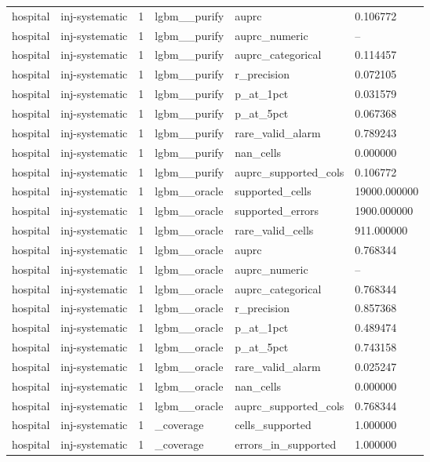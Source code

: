 \begin{tabular}{llllll}
hospital & inj-systematic & 1 & lgbm\_\_purify & auprc & 0.106772 \\
hospital & inj-systematic & 1 & lgbm\_\_purify & auprc\_numeric & -- \\
hospital & inj-systematic & 1 & lgbm\_\_purify & auprc\_categorical & 0.114457 \\
hospital & inj-systematic & 1 & lgbm\_\_purify & r\_precision & 0.072105 \\
hospital & inj-systematic & 1 & lgbm\_\_purify & p\_at\_1pct & 0.031579 \\
hospital & inj-systematic & 1 & lgbm\_\_purify & p\_at\_5pct & 0.067368 \\
hospital & inj-systematic & 1 & lgbm\_\_purify & rare\_valid\_alarm & 0.789243 \\
hospital & inj-systematic & 1 & lgbm\_\_purify & nan\_cells & 0.000000 \\
hospital & inj-systematic & 1 & lgbm\_\_purify & auprc\_supported\_cols & 0.106772 \\
hospital & inj-systematic & 1 & lgbm\_\_oracle & supported\_cells & 19000.000000 \\
hospital & inj-systematic & 1 & lgbm\_\_oracle & supported\_errors & 1900.000000 \\
hospital & inj-systematic & 1 & lgbm\_\_oracle & rare\_valid\_cells & 911.000000 \\
hospital & inj-systematic & 1 & lgbm\_\_oracle & auprc & 0.768344 \\
hospital & inj-systematic & 1 & lgbm\_\_oracle & auprc\_numeric & -- \\
hospital & inj-systematic & 1 & lgbm\_\_oracle & auprc\_categorical & 0.768344 \\
hospital & inj-systematic & 1 & lgbm\_\_oracle & r\_precision & 0.857368 \\
hospital & inj-systematic & 1 & lgbm\_\_oracle & p\_at\_1pct & 0.489474 \\
hospital & inj-systematic & 1 & lgbm\_\_oracle & p\_at\_5pct & 0.743158 \\
hospital & inj-systematic & 1 & lgbm\_\_oracle & rare\_valid\_alarm & 0.025247 \\
hospital & inj-systematic & 1 & lgbm\_\_oracle & nan\_cells & 0.000000 \\
hospital & inj-systematic & 1 & lgbm\_\_oracle & auprc\_supported\_cols & 0.768344 \\
hospital & inj-systematic & 1 & \_coverage & cells\_supported & 1.000000 \\
hospital & inj-systematic & 1 & \_coverage & errors\_in\_supported & 1.000000 \\

\end{tabular}
